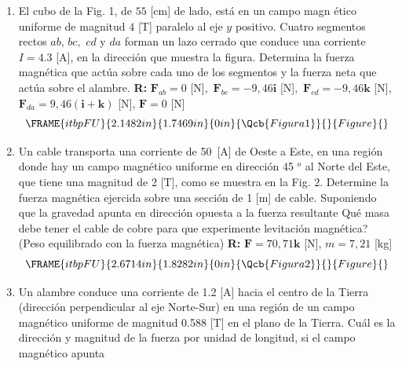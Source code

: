 \documentclass[12pt]{article}
\begin{document}
\begin{enumerate}
\item El cubo de la Fig. 1, de $55$ [cm] de lado, est\'{a} en un campo magn%
\'{e}tico uniforme de magnitud $4$ [T] paralelo al eje $y$ positivo. Cuatro
segmentos rectos $ab$, $bc,$ $cd$ y $da$ forman un lazo cerrado que conduce
una corriente $I=4.3$ [A], en la direcci\'{o}n que muestra la figura.
Determina la fuerza magn\'{e}tica que act\'{u}a sobre cada uno de los
segmentos y la fuerza neta que act\'{u}a sobre el alambre. \textbf{R: }$%
\mathbf{F}_{ab}=0$ [N]$,$ $\mathbf{F}_{bc}=-9,46\mathbf{i}$ [N]$,$ $\mathbf{F%
}_{cd}=-9,46\mathbf{k}$ [N], $\mathbf{F}_{da}=9,46\left( \mathbf{i+k}\right) 
$ [N], $\mathbf{F}=0$ [N] 
\begin{equation*}
\FRAME{itbpFU}{2.1482in}{1.7469in}{0in}{\Qcb{Figura 1}}{}{Figure}{\special%
{language "Scientific Word";type "GRAPHIC";maintain-aspect-ratio
TRUE;display "USEDEF";valid_file "T";width 2.1482in;height 1.7469in;depth
0in;original-width 2.6463in;original-height 2.1465in;cropleft "0";croptop
"1";cropright "1";cropbottom "0";tempfilename
'R2D0SD01.bmp';tempfile-properties "XPR";}}
\end{equation*}

\item Un cable transporta una corriente de 50~[A] de Oeste a Este, en una
regi\'{o}n donde hay un campo magn\'{e}tico uniforme en direcci\'{o}n 45%
${{}^o}$
al Norte del Este, que tiene una magnitud de 2 [T], como se muestra en la
Fig. 2. Determine la fuerza magn\'{e}tica ejercida sobre una secci\'{o}n de
1 [m] de cable. Suponiendo que la gravedad apunta en direcci\'{o}n opuesta a
la fuerza resultante \textquestiondown Qu\'{e} masa debe tener el cable de
cobre para que experimente levitaci\'{o}n magn\'{e}tica? (Peso equilibrado
con la fuerza magn\'{e}tica) \textbf{R:} $\mathbf{F}=70,71\mathbf{k}$ [N], $%
m=7,21$ [kg]%
\begin{equation*}
\FRAME{itbpFU}{2.6714in}{1.8282in}{0in}{\Qcb{Figura 2}}{}{Figure}{\special%
{language "Scientific Word";type "GRAPHIC";maintain-aspect-ratio
TRUE;display "USEDEF";valid_file "T";width 2.6714in;height 1.8282in;depth
0in;original-width 3.7161in;original-height 2.5356in;cropleft "0";croptop
"1";cropright "1";cropbottom "0";tempfilename
'R2D0SD02.bmp';tempfile-properties "XPR";}}
\end{equation*}

\item Un alambre conduce una corriente de 1.2 [A] hacia el centro de la
Tierra (direcci\'{o}n perpendicular al eje Norte-Sur) en una regi\'{o}n de
un campo magn\'{e}tico uniforme de magnitud 0.588 [T] en el plano de la
Tierra. \textquestiondown Cu\'{a}l es la direcci\'{o}n y magnitud de la
fuerza por unidad de longitud, si el campo magn\'{e}tico apunta


\end{enumerate}
\end{document}
